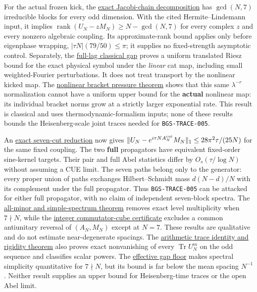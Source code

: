 For the actual frozen kick, the \href{https://github.com/ChurilovMaksim/BGS/blob/main/mathematics/frozen_kick_rank_boundary.md}{exact Jacobi-chain decomposition}
has \(\gcd(N,7)\) irreducible blocks for every odd dimension. With the cited
Hermite--Lindemann input, it implies
\(\operatorname{rank}(U_N-zM_N)\ge N-\gcd(N,7)\) for every complex \(z\) and
every nonzero algebraic coupling. Its approximate-rank bound applies only
before eigenphase wrapping, \(|\tau N|(79/50)\le\pi\); it supplies no fixed-strength
asymptotic control. Separately, the \href{https://github.com/ChurilovMaksim/BGS/blob/main/mathematics/resonance-cohomology/frozen_full_lag_resonance.md}{full-lag classical gap}
proves a uniform translated Riesz bound for the exact physical symbol under
the \emph{linear} cat map, including small weighted-Fourier perturbations. It
does not treat transport by the nonlinear kicked map. The
\href{https://github.com/ChurilovMaksim/BGS/blob/main/mathematics/nonlinear_bracket_pressure.md}{nonlinear bracket pressure theorem} shows
that this same \(\lambda^{-r}\) normalization cannot have a uniform upper
bound for the \textbf{actual} nonlinear map: its individual bracket norms grow
at a strictly larger exponential rate. This result is classical and uses
thermodynamic-formalism inputs; none of these results bounds the
Heisenberg-scale joint traces needed for \texttt{BGS-TRACE-005}.

An \href{https://github.com/ChurilovMaksim/BGS/blob/main/mathematics/frozen_seven_cut_reduction.md}{exact seven-cut reduction} now gives
\(\|U_N-e^{i\tau N A_N^{\rm cut}}M_N\|_1\le28\pi^2\tau/(25N)\)
for the same fixed coupling. The two \textbf{full} propagators have equivalent
fixed-order sine-kernel targets. Their pair and full Abel statistics differ
by \(O_s(\tau/\log N)\) without assuming a CUE limit. The seven paths
belong only to the generator: every proper union of paths exchanges
Hilbert--Schmidt mass \(d(N-d)/N\) with its complement under the full
propagator. Thus \texttt{BGS-TRACE-005} can be attacked for either full
propagator, with no claim of independent seven-block spectra. The
\href{https://github.com/ChurilovMaksim/BGS/blob/main/mathematics/frozen_algebraic_spectral_simplicity.md}{all-minor and simple-spectrum theorem}
removes exact level multiplicity when \(7\nmid N\), while the
\href{https://github.com/ChurilovMaksim/BGS/blob/main/mathematics/frozen_common_antireversor_certificate.md}{integer commutator-cube certificate}
excludes a common antiunitary reversal of \((A_N,M_N)\) except at \(N=7\).
These results are qualitative and do not estimate near-degenerate spacings.
The \href{https://github.com/ChurilovMaksim/BGS/blob/main/mathematics/frozen_arithmetic_trace_rigidity.md}{arithmetic trace identity and rigidity theorem}
also proves exact nonvanishing of every \(\operatorname{Tr}U_N^m\)
on the odd sequence and classifies scalar powers. The
\href{https://github.com/ChurilovMaksim/BGS/blob/main/mathematics/frozen_effective_gap_floor.md}{effective gap floor} makes spectral
simplicity quantitative for \(7\nmid N\), but its bound is far below
the mean spacing \(N^{-1}\). Neither result supplies an upper bound for
Heisenberg-time traces or the open Abel limit.

